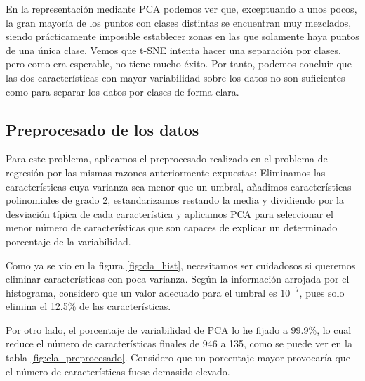 \documentclass[10pt,a4paper]{article}
\begin{document}
En la representación mediante PCA podemos ver que, exceptuando a unos pocos, la gran mayoría de los puntos con clases distintas se encuentran muy mezclados, siendo prácticamente imposible establecer zonas en las que solamente haya puntos de una única clase. Vemos que t-SNE intenta hacer una separación por clases, pero como era esperable, no tiene mucho éxito. Por tanto, podemos concluir que las dos características con mayor variabilidad sobre los datos no son suficientes como para separar los datos por clases de forma clara.






\subsection{Preprocesado de los datos}

Para este problema, aplicamos el preprocesado realizado en el problema de regresión por las mismas razones anteriormente expuestas: Eliminamos las características cuya varianza sea menor que un umbral, añadimos características polinomiales de grado 2, estandarizamos restando la media y dividiendo por la desviación típica de cada característica y aplicamos PCA para seleccionar el menor número de características que son capaces de explicar un determinado porcentaje de la variabilidad.

Como ya se vio en la figura \ref{fig:cla_hist}, necesitamos ser cuidadosos si queremos eliminar características con poca varianza. Según la información arrojada por el histograma, considero que un valor adecuado para el umbral es $10^{-7}$, pues solo elimina el 12.5\% de las características.

Por otro lado, el porcentaje de variabilidad de PCA lo he fijado a 99.9\%, lo cual reduce el número de características finales de 946 a 135, como se puede ver en la tabla \ref{fig:cla_preprocesado}. Considero que un porcentaje mayor provocaría que el número de características fuese demasido elevado.
\end{document}
